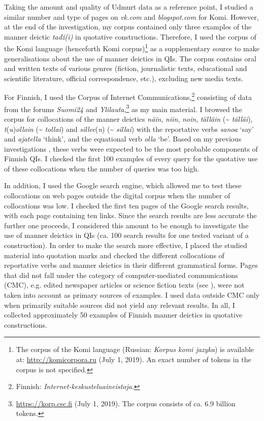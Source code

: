 \documentclass[output=paper,colorlinks,citecolor=brown]{langscibook}
\begin{document}
Taking the amount and quality of Udmurt data as a reference point, I studied a similar number and type of pages on \textit{vk.com} and \textit{blogspot.com} for Komi. However, at the end of the investigation, my corpus contained only three examples of the manner deictic \textit{taďź(i)} in quotative constructions. Therefore, I used the corpus of the Komi language (henceforth Komi corpus)\footnote{The corpus of the Komi language (Russian: \textit{Korpus komi jazyka}) is  available at: \href{http://komicorpora.ru/}{http://komicorpora.ru} (July 1, 2019). An exact number of tokens in the corpus is not specified.} as a supplementary source to make generalisations about the use of manner deictics in QIs. The corpus contains oral and written texts of various genres (fiction, journalistic texts, educational and scientific literature, official correspondence, etc.), excluding new media texts.

For Finnish, I used the Corpus of Internet Communications,\footnote{Finnish: \textit{Internet-keskusteluaineistoja}.} consisting of data from the forums \textit{Suomi24} and \textit{Ylilauta},\footnote{\url{https://korp.csc.fi} (July 1, 2019). The corpus consists of ca. 6.9 billion tokens.} as my main material. I browsed the corpus for collocations of the manner deictics \textit{näin}, \textit{niin}, \textit{noin}, \textit{tälläin} ({\textasciitilde} \textit{tälläi}), \textit{t}(\textit{u})\textit{olloin} ({\textasciitilde} \textit{tollai}) and \textit{sillee}(\textit{n}) ({\textasciitilde} \textit{sillai}) with the reportative verbs \textit{sanoa} ‘say’ and \textit{ajatella} ‘think’, and the equational verb \textit{olla} ‘be’. Based on my previous investigations \citep{Teptiuk2019}, these verbs were expected to be the most probable components of Finnish QIs. I checked the first 100 examples of every query for the quotative use of these collocations when the number of queries was too high.

In addition, I used the Google search engine, which allowed me to test these collocations on web pages outside the digital corpus when the number of collocations was low. I checked the first ten pages of the Google search results, with each page containing ten links. Since the search results are less accurate the further one proceeds, I considered this amount to be enough to investigate the use of manner deictics in QIs (ca. 100 search results for one tested variant of a construction). In order to make the search more effective, I placed the studied material into quotation marks and checked the different collocations of reportative verbs and manner deictics in their different grammatical forms. Pages that did not fall under the category of computer-mediated communications (CMC), e.g. edited newspaper articles or science fiction texts (see \citealt{Crystal2001}), were not taken into account as primary sources of examples. I used data outside CMC only when primarily suitable sources did not yield any relevant results. In all, I collected approximately 50 examples of Finnish manner deictics in quotative constructions.
\end{document}
